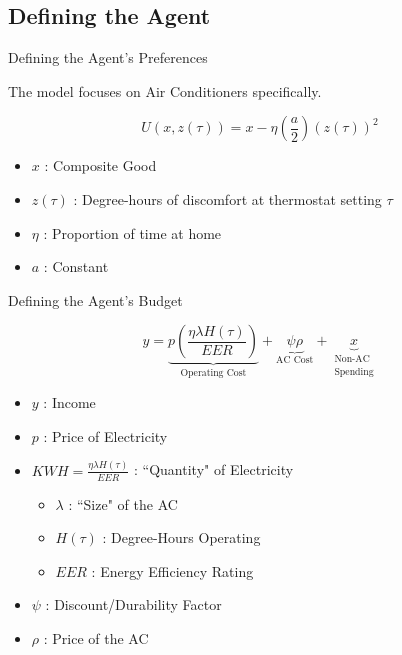 \documentclass[11pt]{beamer}
\begin{document}
\subsection{Defining the Agent}
\begin{frame}{Defining the Agent's Preferences}

The model focuses on Air Conditioners specifically.

\begin{equation}
U(x , z(\tau)) =  x - \eta\left(\frac{a}{2}\right)(z(\tau))^2
\end{equation}

\footnotesize
\begin{itemize}
\item $x$ : Composite Good
\item $z(\tau)$ : Degree-hours of discomfort at thermostat setting $\tau$
\item $\eta$ : Proportion of time at home
\item $a$ : Constant 
\end{itemize}


\end{frame}

\begin{frame}{Defining the Agent's Budget}

\begin{equation}
 y =  \underbrace{p \left(\frac{\eta \lambda H(\tau )}{EER}\right)}_\text{Operating Cost} + \underbrace{\psi \rho}_\text{AC Cost} + \underbrace{x}_{\substack{\text{Non-AC} \\ \text{Spending}}}
\end{equation}

\footnotesize
\begin{itemize}
\item $y$ : Income
\item $p$ : Price of Electricity
\item $KWH = \frac{\eta \lambda H(\tau )}{EER}$ : ``Quantity" of Electricity
\begin{itemize} \footnotesize
	\item $\lambda$ : ``Size" of the AC
	\item $H(\tau)$ : Degree-Hours Operating
	\item $EER$ : Energy Efficiency Rating
\end{itemize}
\item $\psi$ : Discount/Durability Factor
\item $\rho$ : Price of the AC
\end{itemize}


\end{frame}
\end{document}

